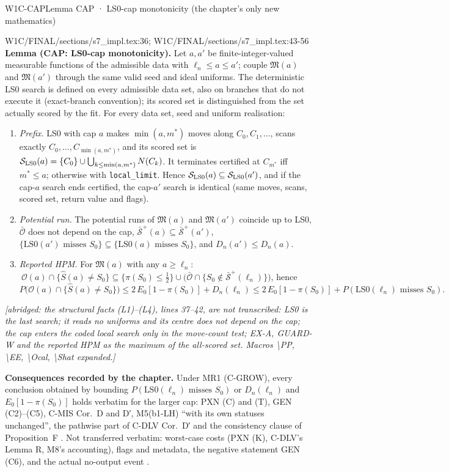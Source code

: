 \begin{card}{W1C-CAP}{Lemma CAP · LS0-cap monotonicity (the chapter's only new mathematics)}
\begin{stmt}{W1C/FINAL/sections/s7_impl.tex:36; W1C/FINAL/sections/s7_impl.tex:43-56}
\textbf{Lemma (CAP: LS0-cap monotonicity).} Let $a,a'$ be finite-integer-valued measurable functions of the admissible data with $\ell_n\le a\le a'$; couple $\mathfrak M(a)$ and $\mathfrak M(a')$ through the same valid seed and ideal uniforms. The deterministic LS0 search is defined on every admissible data set, also on branches that do not execute it (exact-branch convention); its scored set is distinguished from the set actually scored by the fit. For every data set, seed and uniform realisation:
\begin{enumerate}
\item[(a)] \emph{Prefix.} LS0 with cap $a$ makes $\min(a,m^*)$ moves along $C_0,C_1,\dots$, scans exactly $C_0,\dots,C_{\min(a,m^*)}$, and its scored set is $\mathcal S_{\rm LS0}(a)=\{C_0\}\cup\bigcup_{k\le\min(a,m^*)}N(C_k)$. It terminates certified at $C_{m^*}$ iff $m^*\le a$; otherwise with \texttt{local\_limit}. Hence $\mathcal S_{\rm LS0}(a)\subseteq\mathcal S_{\rm LS0}(a')$, and if the cap-$a$ search ends certified, the cap-$a'$ search is identical (same moves, scans, scored set, return value and flags).
\item[(b)] \emph{Potential run.} The potential runs of $\mathfrak M(a)$ and $\mathfrak M(a')$ coincide up to LS0, $\bar{\mathcal O}$ does not depend on the cap, $\bar{\mathcal S}^{+}(a)\subseteq\bar{\mathcal S}^{+}(a')$, $\{\text{LS0}(a')\text{ misses }S_0\}\subseteq\{\text{LS0}(a)\text{ misses }S_0\}$, and $D_n(a')\le D_n(a)$.
\item[(c)] \emph{Reported HPM.} For $\mathfrak M(a)$ with any $a\ge\ell_n$:
$\ \mathcal O(a)\cap\{\hat S(a)\ne S_0\}\subseteq\{\pi(S_0)\le\tfrac12\}\cup\bigl(\bar{\mathcal O}\cap\{S_0\notin\bar{\mathcal S}^{+}(\ell_n)\}\bigr)$, hence
\[
P\bigl(\mathcal O(a)\cap\{\hat S(a)\ne S_0\}\bigr)\le2\,E_0[1-\pi(S_0)]+D_n(\ell_n)\le2\,E_0[1-\pi(S_0)]+P(\text{LS0}(\ell_n)\text{ misses }S_0).
\]
\end{enumerate}
\textit{[abridged: the structural facts (L1)--(L4), lines 37--42, are not transcribed: LS0 is the last search; it reads no uniforms and its centre does not depend on the cap; the cap enters the coded local search only in the move-count test; EX-A, GUARD-W and the reported HPM as the maximum of the all-scored set. Macros \textbackslash PP, \textbackslash EE, \textbackslash Ocal, \textbackslash Shat expanded.]}
\end{stmt}
\textbf{Consequences recorded by the chapter.} Under MR1 (C-GROW), every conclusion obtained by bounding $P(\text{LS0}(\ell_n)\text{ misses }S_0)$ or $D_n(\ell_n)$ and $E_0[1-\pi(S_0)]$ holds verbatim for the larger cap: PXN (C) and (T), GEN (C2)--(C5), C-MIS Cor.~D and D′, M5(b1-LH) ``with its own statuses unchanged'', the pathwise part of C-DLV Cor.~D′ and the consistency clause of Proposition~F . Not transferred verbatim: worst-case costs (PXN (K), C-DLV's Lemma R, M8's accounting), flags and metadata, the negative statement GEN (C6), and the actual no-output event .

\end{card}
